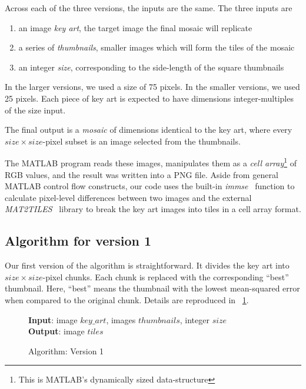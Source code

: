 \documentclass[11pt,conference]{IEEEtran}
\begin{document}
Across each of the three versions, the inputs are the same. The three inputs are

\begin{enumerate}
    \item an image \textit{key art}, the target image the final mosaic will
        replicate
    \item a series of \textit{thumbnails}, smaller images which will form the
        tiles of the mosaic
    \item an integer \textit{size}, corresponding to the side-length of the
        square thumbnails
\end{enumerate}

In the larger versions, we used a size of 75 pixels. In the smaller versions, we
used 25 pixels. Each piece of key art is expected to have dimensions
integer-multiples of the size input.

The final output is a \textit{mosaic} of dimensions identical to the key art,
where every \(size \times size\)-pixel subset is an image selected from the
thumbnails.

The MATLAB program reads these images, manipulates them as a \textit{cell
array}\footnote{This is MATLAB's dynamically sized data-structure} of RGB
values, and the result was written into a PNG file. Aside from general MATLAB
control flow constructs, our code uses the built-in \textit{immse}~\cite{immse}
function to calculate pixel-level differences between two images and the
external \textit{MAT2TILES}~\cite{mat2tiles} library to break the key art images
into tiles in a cell array format.

\subsection{Algorithm for version 1}\label{S:algv1}

Our first version of the algorithm is straightforward. It divides the key art
into \(size \times size\)-pixel chunks. Each chunk is replaced with the
corresponding ``best'' thumbnail. Here, ``best'' means the thumbnail with the
lowest mean-squared error when compared to the original chunk. Details are
reproduced in \figurename~\ref{alg:v1}.

\begin{figure}[!t]
    \textbf{Input}: image \(key\_art\), images \(thumbnails\), integer \(size\) \\
    \textbf{Output}: image \(tiles\)
    \begin{algorithmic}
            \ENDFOR
        \ENDFOR
    \end{algorithmic}
    \caption{Algorithm: Version 1}\label{alg:v1}
\end{figure}
\end{document}
